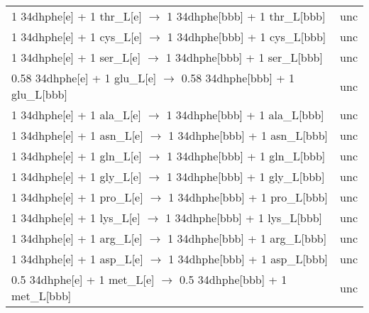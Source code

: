 \begin{table}[h]
\begin{center}
\begin{tabularx}{\textwidth}{L{12cm}L{2.5cm}}
    1 34dhphe[e] + 1 thr\_L[e] $\rightarrow$ 1 34dhphe[bbb] + 1 thr\_L[bbb]       &  unc  \\
	1 34dhphe[e] + 1 cys\_L[e] $\rightarrow$ 1 34dhphe[bbb] + 1 cys\_L[bbb]       &  unc  \\
	1 34dhphe[e] + 1 ser\_L[e] $\rightarrow$ 1 34dhphe[bbb] + 1 ser\_L[bbb]       &  unc   \\
    0.58 34dhphe[e] + 1 glu\_L[e] $\rightarrow$ 0.58 34dhphe[bbb] + 1 glu\_L[bbb] &  unc  \\
	1 34dhphe[e] + 1 ala\_L[e] $\rightarrow$ 1 34dhphe[bbb] + 1 ala\_L[bbb]       &  unc  \\
	1 34dhphe[e] + 1 asn\_L[e] $\rightarrow$ 1 34dhphe[bbb] + 1 asn\_L[bbb]       &  unc  \\
	1 34dhphe[e] + 1 gln\_L[e] $\rightarrow$ 1 34dhphe[bbb] + 1 gln\_L[bbb]       &  unc  \\
	1 34dhphe[e] + 1 gly\_L[e] $\rightarrow$ 1 34dhphe[bbb] + 1 gly\_L[bbb]      &  unc  \\
	1 34dhphe[e] + 1 pro\_L[e] $\rightarrow$ 1 34dhphe[bbb] + 1 pro\_L[bbb]      &  unc  \\
	1 34dhphe[e] + 1 lys\_L[e] $\rightarrow$ 1 34dhphe[bbb] + 1 lys\_L[bbb]      &  unc  \\
	1 34dhphe[e] + 1 arg\_L[e] $\rightarrow$ 1 34dhphe[bbb] + 1 arg\_L[bbb]      &  unc  \\
	1 34dhphe[e] + 1 asp\_L[e] $\rightarrow$ 1 34dhphe[bbb] + 1 asp\_L[bbb]      &  unc  \\
	0.5 34dhphe[e] + 1 met\_L[e] $\rightarrow$ 0.5 34dhphe[bbb] + 1 met\_L[bbb]  &  unc  \\
	\hline
	\end{tabularx}
\end{center}
\label{tbl:tbls6}%
\end{table}

